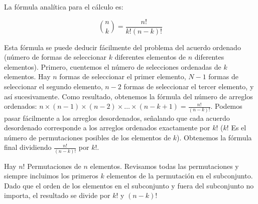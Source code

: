 La fórmula analítica para el cálculo es:

$$\binom n k = \frac {n!} {k!(n-k)!}$$

Esta fórmula se puede deducir fácilmente del problema del acuerdo ordenado (número de formas de seleccionar $k$ diferentes elementos de $n$ diferentes elementos). Primero, cuentemos el número de selecciones ordenadas de $k$ elementos. Hay $n$ formas de seleccionar el primer elemento, $ N-1 $ formas de seleccionar el segundo elemento, $n-2$ formas de seleccionar el tercer elemento, y así sucesivamente. Como resultado, obtenemos la fórmula del número de arreglos ordenados:
$n \times(n-1)\times (n-2)\times \ldots \times (n-k +1) = \frac{n!}{(n-k)!}$. Podemos pasar fácilmente a los arreglos desordenados, señalando que cada acuerdo desordenado corresponde a los arreglos ordenados exactamente por $k!$ ($k!$ Es el número de permutaciones posibles de los elementos de $k$). Obtenemos la fórmula final dividiendo
$\frac{n!}{(n-k)!}$ por $k!$.

Hay $n!$ Permutaciones de $n$ elementos. Revisamos todas las permutaciones y siempre incluimos los primeros $k$ elementos de la permutación en el subconjunto. Dado que el orden de los elementos en el subconjunto y fuera del subconjunto no importa, el resultado se divide por $k!$ y $(n-k)!$


